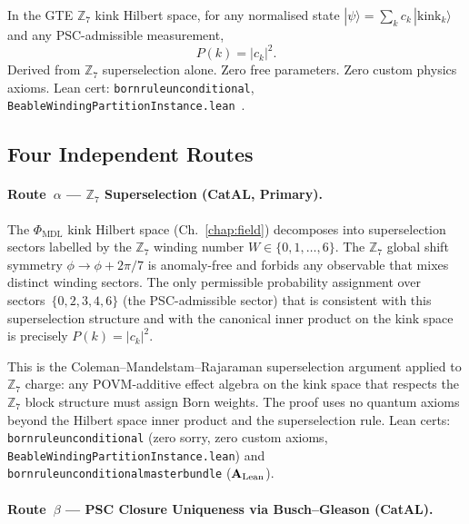 \documentclass[11pt,openany]{book}
\theoremstyle{remark}
\newcommand{\MDL}{\text{MDL}}
\newcommand{\lean}[1]{%
  \penalty-100
  \begingroup\def\_{\textunderscore\allowbreak}\texttt{#1}\endgroup}
\newcommand{\CatAL}{\ensuremath{\textbf{A}_{\rm Lean}}}
\begin{document}
\begin{tcolorbox}[colback=orange!5,colframe=orange!60,
  title={Result: The Born Rule Is a Theorem (\CatAL)}]
  In the GTE $\mathbb{Z}_7$ kink Hilbert space, for any normalised state
  $|\psi\rangle = \sum_k c_k\,|\text{kink}_k\rangle$ and any PSC-admissible
  measurement,
  \[
    P(k) = |c_k|^2.
  \]
  Derived from $\mathbb{Z}_7$ superselection alone.  Zero free parameters.
  Zero custom physics axioms.  Lean cert: \lean{born\_rule\_unconditional},
  \lean{BeableWindingPartitionInstance.lean}~\cite{SpivackQMFromR110,SpivackCompleteness}.
\end{tcolorbox}

\subsection*{Four Independent Routes}

\paragraph{Route~$\alpha$ --- $\mathbb{Z}_7$ Superselection (CatAL, Primary).}

The $\Phi_{\MDL}$ kink Hilbert space (Ch.~\ref{chap:field}) decomposes into
superselection sectors labelled by the $\mathbb{Z}_7$ winding number $W \in
\{0,1,\ldots,6\}$.  The $\mathbb{Z}_7$ global shift symmetry $\phi \to \phi +
2\pi/7$ is anomaly-free and forbids any observable that mixes distinct winding sectors.
The only permissible probability assignment over sectors~$\{0,2,3,4,6\}$ (the
PSC-admissible sector) that is consistent with this superselection structure and with
the canonical inner product on the kink space is precisely $P(k) = |c_k|^2$.

This is the Coleman--Mandelstam--Rajaraman superselection argument applied to
$\mathbb{Z}_7$ charge: any POVM-additive effect algebra on the kink space that
respects the $\mathbb{Z}_7$ block structure must assign Born weights.  The proof
uses no quantum axioms beyond the Hilbert space inner product and the superselection
rule.  Lean certs: \lean{born\_rule\_unconditional} (zero sorry, zero custom axioms,
\lean{BeableWindingPartitionInstance.lean}) and
\lean{born\_rule\_unconditional\_master\_bundle} (\CatAL).

\paragraph{Route~$\beta$ --- PSC Closure Uniqueness via Busch--Gleason (CatAL).}
\end{document}
